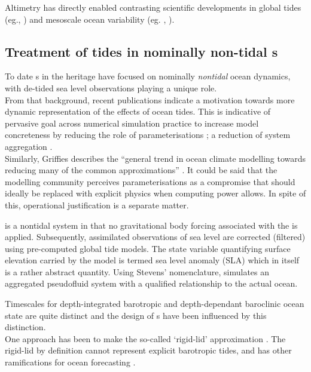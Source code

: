 Altimetry has directly enabled contrasting scientific developments in global tides (eg.\citet{Egbert:1996vr},  \citet{Lefevre:2011dg}) and mesoscale ocean variability (eg.  \citet{Wunsch:1998bq}, \citet{Chelton:vi}).

 
\subsection{Treatment of tides in nominally non-tidal \OGCM{}s}
\label{S:tides_ogcm}
To date \OGCM{}s in the \GODAE{} heritage have focused on nominally \emph{nontidal} ocean dynamics, with de-tided sea level observations playing a unique role.\\


From that background, recent publications indicate a motivation towards more dynamic representation of the effects of ocean tides.   This is indicative of pervasive goal across numerical simulation practice to increase model concreteness by reducing the role of parameterisations \cite[section 5.3]{Petersen:2012tr}; a reduction of system aggregation \citep{Stevens:2001kb}.\\
Similarly, Griffies describes the ``general trend in ocean climate modelling towards reducing many of the common approximations'' \citep[pp20] {Griffies:2004vs}.
It could be said that the modelling community perceives parameterisations as a compromise that should ideally be replaced with explicit physics when computing power allows.  In spite of this, operational justification is a separate matter.



\BL{} is a nontidal system in that no gravitational body forcing associated with the \ATGP{} is applied.   Subsequently, assimilated observations of sea level are corrected (filtered) using pre-computed global tide models.  The state variable quantifying surface elevation carried by the model is termed sea level anomaly (SLA) which in itself is a rather abstract quantity. Using Stevens' nomenclature, \BL{} simulates an aggregated pseudofluid system with a qualified relationship to the actual ocean.


Timescales for depth-integrated barotropic and depth-dependant baroclinic ocean state are quite distinct and the design of \OGCM{}s have been influenced by this distinction. \\
One approach has been to make the so-called `rigid-lid' approximation \cite[pp128]{gill1982atmosphere}. 
The rigid-lid by definition cannot represent explicit barotropic tides, and has other ramifications for ocean forecasting \cite[pp19]{Griffies:2004vs}.\\


